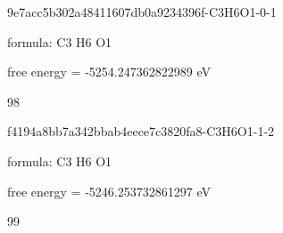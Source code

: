 \documentclass{article}
\begin{document}
\vspace{1cm}


9e7acc5b302a48411607db0a9234396f-C3H6O1-0-1



formula: C3 H6 O1



free energy = -5254.247362822989 eV

98

\vspace{1cm}


f4194a8bb7a342bbab4eece7c3820fa8-C3H6O1-1-2



formula: C3 H6 O1



free energy = -5246.253732861297 eV

99
\end{document}
